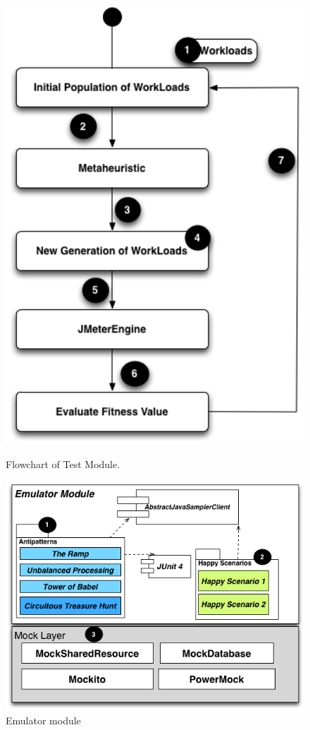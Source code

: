 \documentclass[espaco=umemeio,chapter=TITLE,twoside,openright]{abnt}
\begin{document}
\begin{figure}[h]
\begin{minipage}{.5\textwidth}
\centering
\includegraphics[width=1\textwidth]{./images/step2.png}
\caption{Flowchart of Test Module.}
\label{fig:step2}
\end{minipage}
\begin{minipage}{.5\textwidth}
\centering
\includegraphics[width=1\textwidth]{./images/emulator.png}
\caption{Emulator module}
\label{fig:emulator}
\end{minipage}
\end{figure}
\end{document}
